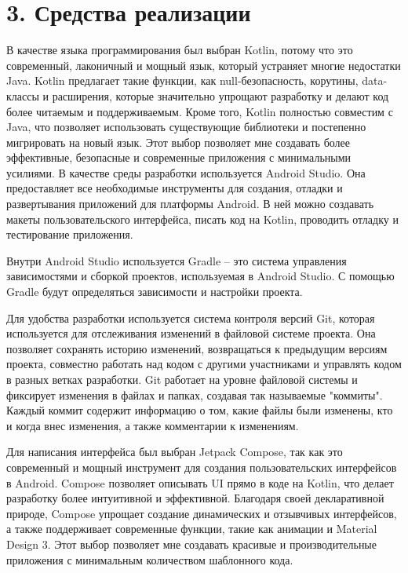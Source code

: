 \documentclass{vsureport}
\begin{document}
\newpage 
\section*{3. Средства реализации}

В качестве языка программирования был выбран Kotlin, потому что это современный, лаконичный и мощный язык, который устраняет многие недостатки Java. Kotlin предлагает такие функции, как null-безопасность, корутины, data-классы и расширения, которые значительно упрощают разработку и делают код более читаемым и поддерживаемым. Кроме того, Kotlin полностью совместим с Java, что позволяет использовать существующие библиотеки и постепенно мигрировать на новый язык. Этот выбор позволяет мне создавать более эффективные, безопасные и современные приложения с минимальными усилиями. В качестве среды разработки используется Android Studio. Она предоставляет все необходимые инструменты для создания, отладки и развертывания приложений для платформы Android. В ней можно создавать макеты пользовательского интерфейса, писать код на Kotlin, проводить отладку и тестирование приложения.

Внутри Android Studio используется Gradle – это система управления зависимостями и сборкой проектов, используемая в Android Studio. С помощью Gradle будут определяться зависимости и настройки проекта. \cite{ref4}

Для удобства разработки используется система контроля версий Git, которая используется для отслеживания изменений в файловой системе проекта. Она позволяет сохранять историю изменений, возвращаться к предыдущим версиям проекта, совместно работать над кодом с другими участниками и управлять кодом в разных ветках разработки. Git работает на уровне файловой системы и фиксирует изменения в файлах и папках, создавая так называемые "коммиты". Каждый коммит содержит информацию о том, какие файлы были изменены, кто и когда внес изменения, а также комментарии к изменениям. \cite{ref4}

Для написания интерфейса был выбран Jetpack Compose, так как это современный и мощный инструмент для создания пользовательских интерфейсов в Android. Compose позволяет описывать UI прямо в коде на Kotlin, что делает разработку более интуитивной и эффективной. Благодаря своей декларативной природе, Compose упрощает создание динамических и отзывчивых интерфейсов, а также поддерживает современные функции, такие как анимации и Material Design 3. Этот выбор позволяет мне создавать красивые и производительные приложения с минимальным количеством шаблонного кода. \cite{ref5}\cite{ref6}
\end{document}
